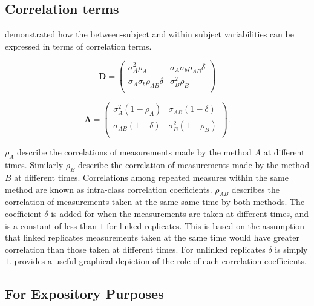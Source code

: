 \documentclass[MAIN.tex]{subfiles}
\begin{document}
\subsection{Correlation terms}
\citet{hamlett} demonstrated how the between-subject and within subject variabilities can be expressed in terms of
correlation terms.

\[
\boldsymbol{D} = \left( \begin{array}{cc}
\sigma^2_{A}\rho_{A} & \sigma_{A}\sigma_{b}\rho_{AB}\delta \\
\sigma_{A}\sigma_{b}\rho_{AB}\delta & \sigma^2_{B}\rho_{B}\\

\end{array}\right)
\]

\[
\boldsymbol{\Lambda} = \left(
\begin{array}{cc}
\sigma^2_{A}(1-\rho_{A}) & \sigma_{AB}(1-\delta)  \\
\sigma_{AB}(1-\delta) & \sigma^2_{B}(1-\rho_{B}) \\
\end{array}\right).
\]

$\rho_{A}$ describe the correlations of measurements made by the method $A$ at different times. Similarly $\rho_{B}$ describe the correlation of measurements made by the method $B$ at different times. Correlations among repeated measures within the same method are known as intra-class correlation coefficients. $\rho_{AB}$ describes the correlation of measurements taken at the same same time by both methods. The coefficient $\delta$ is added for when the measurements are taken at different times, and is a constant of less than $1$ for linked replicates. This is based on the assumption that linked replicates measurements taken at the same time would have greater correlation than those taken at different times. For unlinked replicates $\delta$ is simply $1$. \citet{hamlett} provides a useful graphical depiction of the role of each correlation coefficients.
















\subsection{For Expository Purposes}
\end{document}

